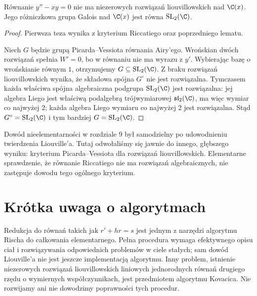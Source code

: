 \begin{twierdzenie}
Równanie $y''-xy=0$ nie ma niezerowych rozwiązań liouvillowskich nad $\C(x)$. Jego różniczkowa grupa Galois nad $\C(x)$ jest równa $\mathrm{SL}_2(\C)$.
\end{twierdzenie}
\begin{proof}
Pierwsza teza wynika z kryterium Riccatiego oraz poprzedniego lematu.

Niech $G$ będzie grupą Picarda--Vessiota równania Airy'ego. Wrońskian dwóch rozwiązań spełnia $W'=0$, bo w równaniu nie ma wyrazu z $y'$. Wybierając bazę o wrońskianie równym $1$, otrzymujemy $G\subseteq\mathrm{SL}_2(\C)$. Z braku rozwiązań liouvillowskich wynika, że składowa spójna $G^\circ$ nie jest rozwiązalna. Tymczasem każda właściwa spójna algebraiczna podgrupa $\mathrm{SL}_2(\C)$ jest rozwiązalna: jej algebra Liego jest właściwą podalgebrą trójwymiarowej $\mathfrak{sl}_2(\C)$, ma więc wymiar co najwyżej $2$; każda algebra Liego wymiaru co najwyżej $2$ jest rozwiązalna. Stąd $G^\circ=\mathrm{SL}_2(\C)$ i tym bardziej $G=\mathrm{SL}_2(\C)$.
\end{proof}

\begin{uwaga}
Dowód nieelementarności w rozdziale 9 był samodzielny po udowodnieniu twierdzenia Liouville'a. Tutaj odwołaliśmy się jawnie do innego, głębszego wyniku: kryterium Picarda--Vessiota dla rozwiązań liouvillowskich. Elementarne sprawdzenie, że równanie Riccatiego nie ma rozwiązań algebraicznych, nie zastępuje dowodu tego ogólnego kryterium.
\end{uwaga}

\section{Krótka uwaga o algorytmach}

Redukcja do równań takich jak $r'+hr=s$ jest jednym z narzędzi algorytmu Rischa do całkowania elementarnego. Pełna procedura wymaga efektywnego opisu ciał i rozwiązywania odpowiednich problemów w ciele stałych; sam dowód Liouville'a nie jest jeszcze implementacją algorytmu. Inny problem, istnienie niezerowych rozwiązań liouvillowskich liniowych jednorodnych równań drugiego rzędu o wymiernych współczynnikach, jest przedmiotem algorytmu Kovacica. Nie rozwijamy ani nie dowodzimy poprawności tych procedur.

